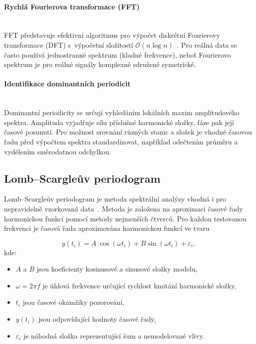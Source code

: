 \paragraph{Rychlá Fourierova transformace (FFT)}\leavevmode\\
FFT představuje efektivní algoritmus pro výpočet diskrétní Fourierovy \mbox{transformace} (DFT) s~výpočetní složitostí $\mathcal{O}(n \log n)$~\cite{cooley_tukey_1965}. Pro reálná data se často používá jedno\-stranné spektrum (kladné frekvence), neboť Fourierovo spektrum je pro reálné signály komplexně sdruženě symetrické.

\paragraph{Identifikace dominantních periodicit}\leavevmode\\
Dominantní periodicity se určují vyhledáním lokálních maxim amplitudového spektra. Amplituda vyjadřuje sílu příslušné harmonické složky, fáze pak její časové posunutí. Pro možnost srovnání různých stanic a složek je vhodné časovou řadu před výpočtem spektra standardizovat, například odečtením průměru a vydělením směrodatnou odchylkou.

\subsection{Lomb--Scargleův periodogram}

Lomb--Scargleův periodogram je metoda spektrální analýzy vhodná i pro nepravidelně vzorkovaná data~\cite{lomb_scargle}. Metoda je založena na aproximaci časové řady harmonickou funkcí pomocí metody nejmenších čtverců. Pro každou testovanou frekvenci je časová řada aproximována harmonickou funkcí ve tvaru

\begin{equation}
y(t_i) = A~\cos(\omega t_i) + B \sin(\omega t_i) + \varepsilon_i,
\end{equation}
kde:
\begin{itemize}
    \item \(A\) a \(B\) jsou koeficienty kosinusové a sinusové složky modelu,
    \item \(\omega = 2\pi f\) je úhlová frekvence určující rychlost kmitání harmonické složky,
    \item \(t_i\) jsou časové okamžiky pozorování,
    \item \(y(t_i)\) jsou odpovídající hodnoty časové řady,
    \item \(\varepsilon_i\) je náhodná složka reprezentující šum a nemodelované vlivy.
\end{itemize}


